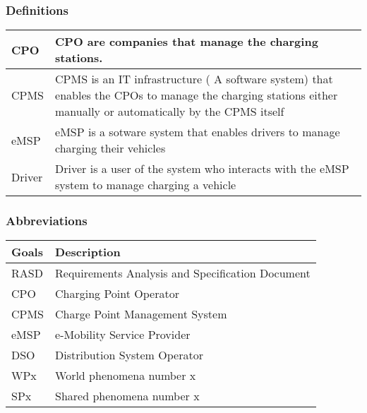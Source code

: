 \documentclass{article}
\begin{document}
\subsubsection{Definitions}
\begin{tabularx}{1\textwidth} { 
  | >{\raggedright\arraybackslash}X 
  | >{\raggedright\arraybackslash}X
  | }
\hline

CPO & CPO are companies that manage the charging stations.\\
\hline

CPMS & CPMS is an IT infrastructure ( A software system) that enables the CPOs to manage the charging stations either manually or automatically by the CPMS itself \\
\hline

eMSP & eMSP is a sotware system that enables drivers to manage charging their vehicles \\
\hline

Driver & Driver is a user of the system who interacts with the eMSP system to manage charging a vehicle \\
\hline






\end{tabularx}
\subsubsection{Abbreviations}

\vspace{0.2cm}

\begin{tabularx}{1\textwidth} { 
  | >{\raggedright\arraybackslash}X 
  | >{\raggedright\arraybackslash}X
  | }
 \hline
\textbf {Goals} & \textbf{ Description} \\ 
\hline
 RASD  &   Requirements Analysis and Specification Document \\
\hline
CPO & Charging Point Operator \\
\hline
CPMS & Charge Point Management System \\
\hline
eMSP & e-Mobility Service Provider \\
\hline
DSO & Distribution System Operator \\
\hline
WPx & World phenomena number x \\
\hline
SPx & Shared phenomena number x\\
\hline


\end{tabularx}
\end{document}
